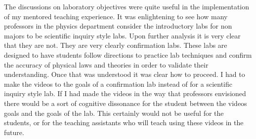 \documentclass{article}
\begin{document}
The discussions on laboratory objectives were quite useful in the implementation of my mentored teaching experience. It was enlightening to see how many professors in the physics department consider the introductory labs for non majors to be scientific inquiry style labs. Upon further analysis it is very clear that they are not. They are very clearly confirmation labs. These labs are designed to have students follow directions to practice lab techniques and confirm the accuracy of physical laws and theories in order to validate their understanding. Once that was understood it was clear how to proceed. I had to make the videos to the goals of a confirmation lab instead of for a scientific inquiry style lab. If I had made the videos in the way that professors envisioned there would be a sort of cognitive dissonance for the student between the videos goals and the goals of the lab. This certainly would not be useful for the students, or for the teaching assistants who will teach using these videos in the future. 
\end{document}
